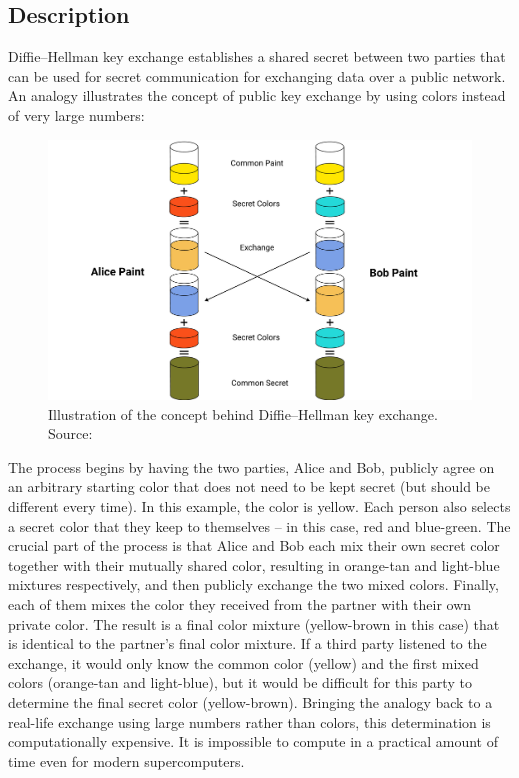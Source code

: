 \subsection{Description}\label{subsec:description}
Diffie–Hellman key exchange establishes a shared secret between two parties that can be used for secret communication
for exchanging data over a public network.
An analogy illustrates the concept of public key exchange by using colors instead of very large numbers:
\begin{figure}[H]
    \centering
    \includegraphics[width=1\textwidth]{Pictures/Diffie-Hellman.pdf}
    \caption{Illustration of the concept behind Diffie–Hellman key exchange. Source: }\label{fig:figure4}
\end{figure}
The process begins by having the two parties, Alice and Bob, publicly agree on an arbitrary starting color that does
not need to be kept secret (but should be different every time).
In this example, the color is yellow.
Each person also selects a secret color that they keep to themselves – in this case, red and blue-green.
The crucial part of the process is that Alice and Bob each mix their own secret color together with their mutually
shared color, resulting in orange-tan and light-blue mixtures respectively, and then publicly exchange the two mixed colors.
Finally, each of them mixes the color they received from the partner with their own private color.
The result is a final color mixture (yellow-brown in this case) that is identical to the partner's final color mixture.
If a third party listened to the exchange, it would only know the common color (yellow) and the first mixed colors
(orange-tan and light-blue), but it would be difficult for this party to determine the final secret color (yellow-brown).
Bringing the analogy back to a real-life exchange using large numbers rather than colors, this determination is
computationally expensive.
It is impossible to compute in a practical amount of time even for modern supercomputers.

